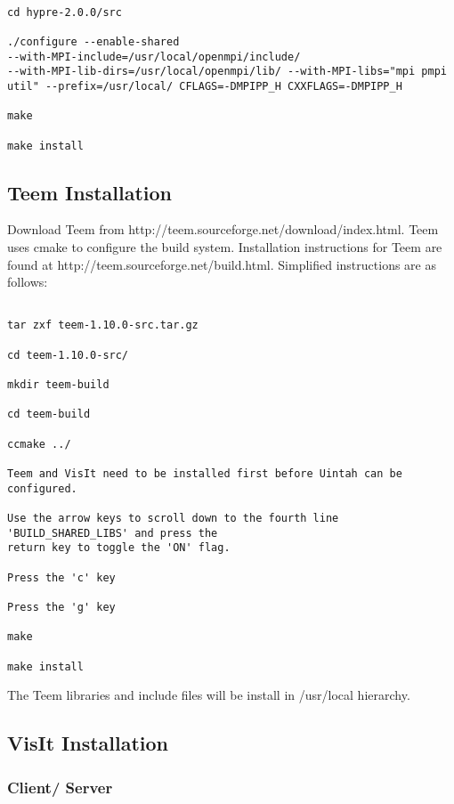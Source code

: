 \begin{Verbatim}

cd hypre-2.0.0/src

./configure --enable-shared
--with-MPI-include=/usr/local/openmpi/include/
--with-MPI-lib-dirs=/usr/local/openmpi/lib/ --with-MPI-libs="mpi pmpi
util" --prefix=/usr/local/ CFLAGS=-DMPIPP_H CXXFLAGS=-DMPIPP_H

make

make install

\end{Verbatim}

 

\subsection{Teem Installation}
\label{sec:teem}


Download Teem from http://teem.sourceforge.net/download/index.html.  Teem uses cmake to configure the build system. Installation instructions for Teem are found at http://teem.sourceforge.net/build.html.  Simplified instructions are as follows:

\begin{verbatim}

tar zxf teem-1.10.0-src.tar.gz

cd teem-1.10.0-src/

mkdir teem-build

cd teem-build

ccmake ../

Teem and VisIt need to be installed first before Uintah can be configured.

Use the arrow keys to scroll down to the fourth line 'BUILD_SHARED_LIBS' and press the 
return key to toggle the 'ON' flag.

Press the 'c' key

Press the 'g' key

make

make install

\end{verbatim}

The Teem libraries and include files will be install in /usr/local hierarchy.

\subsection{VisIt Installation}

\subsubsection{Client/ Server}
\label{sec:ClientServer}

